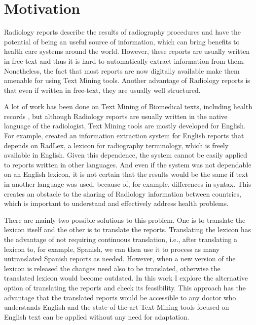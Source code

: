 \label{chap1}

\section{Motivation}
\label{motivation}

Radiology reports describe the results of radiography procedures and have the potential of being an useful source of information, which can bring benefits to health care systems around the world. However, these reports are usually written in free-text and thus it is hard to automatically extract information from them. Nonetheless, the fact that most reports are now digitally available make them amenable for using Text Mining tools. Another advantage of Radiology reports is that even if written in free-text, they are usually well structured.

A lot of work has been done on Text Mining of Biomedical texts, including health records \citep{Pons2016}, but although Radiology reports are usually written in the native language of the radiologist, Text Mining tools are mostly developed for English. For example, \citep{Hassanpour2016} created an information extraction system for English reports that depends on RadLex, a lexicon for radiography terminology, which is freely available in English. Given this dependence, the system cannot be easily applied to reports written in other languages. And even if the system was not dependable on an English lexicon, it is not certain that the results would be the same if text in another language was used, because of, for example, differences in syntax. This creates an obstacle to the sharing of Radiology information between countries, which is important to understand and effectively address health problems.

There are mainly two possible solutions to this problem. One is to translate the lexicon itself \citep{Bretschneider} and the other is to translate the reports. Translating the lexicon has the advantage of not requiring continuous translation, i.e., after translating a lexicon to, for example, Spanish, we can then use it to process as many untranslated Spanish reports as needed. However, when a new version of the lexicon is released the changes need also to be translated, otherwise the translated lexicon would become outdated. In this work I explore the alternative option of translating the reports and check its feasibility. This approach has the advantage that the translated reports would be accessible to any doctor who understands English and the state-of-the-art Text Mining tools focused on English text can be applied without any need for adaptation. 

